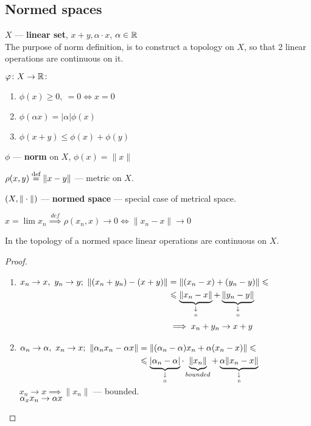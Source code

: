 \subsection{Normed spaces}
\begin{defn}
  $X$ --- \textbf{linear set}, $x + y, \alpha \cdot x$, $\alpha \in \mathbb{R}$ \\
  The purpose of norm definition, is to construct a topology on $X$, so that 2 linear operations are continuous on it.
\end{defn}
$\varphi\colon X \to \mathbb{R}\colon$
\begin{enumerate}
\item $\phi(x) \geq 0,\ = 0 \iff x = 0$
\item $\phi(\alpha x) = |\alpha| \phi(x)$
\item $\phi(x + y) \leq \phi(x) + \phi(y)$
\end{enumerate}
\begin{defn}
  $\phi$ --- \textbf{norm} on $X$, $\phi(x) = \|x\|$
\end{defn}
$\rho(x, y) \overset{\text{def}}{=} \|x - y\|$ --- metric on $X$. 
\begin{defn}
  $\\(X, \|\cdot\|)$ --- \textbf{normed space} --- special case of metrical space.
\end{defn}
\noindent
$x = \lim x_n \overset{def}{\implies} \rho(x_n, x) \to 0 \iff \|x_n - x\| \to 0$
\begin{stm}
  In the topology of a normed space linear operations are continuous on $X$.
\end{stm}
\begin{proof}
  \begin{enumerate}
  \item 
    $\begin{aligned}[t]
      x_n \to x,\ y_n \to y;\ \|(x_n + y_n) - (x + y)\| & = \|(x_n - x) + (y_n - y)\|  \leqslant \\ 
      & \leqslant  \underbrace{\|x_n - x\|}_{\underset{0}{\downarrow}} + \underbrace{\|y_n - y\|}_{\underset{0}{\downarrow}} \\
      & \implies x_n + y_n \to x + y
    \end{aligned}$
  \item 
    $\begin{aligned}[t]
       \alpha_n \to \alpha,\ x_n \to x;\ \|\alpha_n x_n - \alpha x\| & =
        \|(\alpha_n - \alpha)x_n + \alpha(x_n - x)\| \leqslant \\
        & \leqslant \underbrace{|\alpha_n - \alpha|}_{\underset{0}{\downarrow}} \cdot \underbrace{\|x_n\|}_{bounded} + \underbrace{\alpha\|x_n - x\|}_{\underset{0}{\downarrow}}
    \end{aligned}$ \\
    $x_n \to x \implies \|x_n\|$ --- bounded. \\
    $\alpha_x x_n \to \alpha x\qedhere$
  \end{enumerate}
\end{proof}
